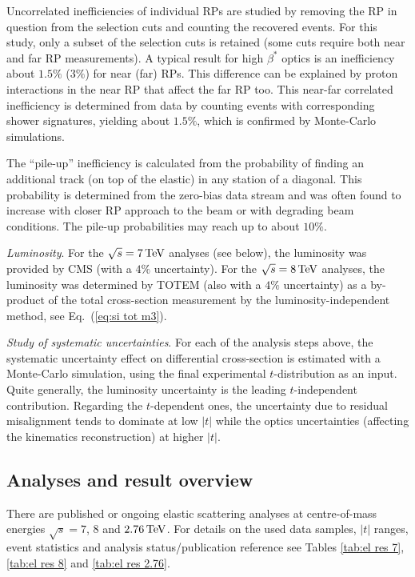 \documentclass{desyproc}
\def\un#1{\,{\rm #1}}
\begin{document}
Uncorrelated inefficiencies of individual RPs are studied by removing the RP in question from the selection cuts and counting the recovered events. For this study, only a subset of the selection cuts is retained (some cuts require both near and far RP measurements). A typical result for high $\beta^*$ optics is an inefficiency about $1.5\%$ ($3\%$) for near (far) RPs. This difference can be explained by proton interactions in the near RP that affect the far RP too. This near-far correlated inefficiency is determined from data by counting events with corresponding shower signatures, yielding about $1.5\%$, which is confirmed by Monte-Carlo simulations.

The ``pile-up'' inefficiency is calculated from the probability of finding an additional track (on top of the elastic) in any station of a diagonal. This probability is determined from the zero-bias data stream and was often found to increase with closer RP approach to the beam or with degrading beam conditions. The pile-up probabilities may reach up to about $10\%$.

{\em Luminosity}. For the $\sqrt s = 7\un{TeV}$ analyses (see below), the luminosity was provided by CMS (with a $4\%$ uncertainty). For the $\sqrt s = 8\un{TeV}$ analyses, the luminosity was determined by TOTEM (also with a $4\%$ uncertainty) as a by-product of the total cross-section measurement by the luminosity-independent method, see Eq.~(\ref{eq:si tot m3}).

{\em Study of systematic uncertainties}. For each of the analysis steps above, the systematic uncertainty effect
on differential cross-section is estimated with a Monte-Carlo simulation, using the final experimental $t$-distribution as an input. Quite generally, the luminosity uncertainty is the leading $t$-independent contribution. Regarding the $t$-dependent ones, the uncertainty due to residual misalignment tends to dominate at low $|t|$ while the optics uncertainties (affecting the kinematics reconstruction) at higher $|t|$.


\subsection{Analyses and result overview}

There are published or ongoing elastic scattering analyses at centre-of-mass energies $\sqrt s = 7$, $8$ and $2.76\un{TeV}$. For details on the used data samples, $|t|$ ranges, event statistics and analysis status/publication reference see Tables \ref{tab:el res 7}, \ref{tab:el res 8} and \ref{tab:el res 2.76}.
\end{document}
